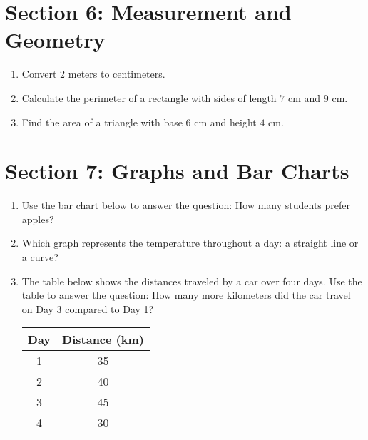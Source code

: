 \documentclass[12pt]{article}
\begin{document}
\section*{Section 6: Measurement and Geometry}
\begin{enumerate}
  \item Convert $2$ meters to centimeters.
  \item Calculate the perimeter of a rectangle with sides of length $7$ cm and $9$ cm.
  \item Find the area of a triangle with base $6$ cm and height $4$ cm.
\end{enumerate}

\section*{Section 7: Graphs and Bar Charts}
\begin{enumerate}
  \item Use the bar chart below to answer the question: How many students prefer apples?
  
  \begin{center}
  \end{center}
  
  \item Which graph represents the temperature throughout a day: a straight line or a curve?
  \item The table below shows the distances traveled by a car over four days. Use the table to answer the question: How many more kilometers did the car travel on Day 3 compared to Day 1?
  
  \begin{center}
  \begin{tabular}{|c|c|}
    \hline
    \textbf{Day} & \textbf{Distance (km)} \\
    \hline
    1 & 35 \\
    2 & 40 \\
    3 & 45 \\
    4 & 30 \\
    \hline
  \end{tabular}
  \end{center}
\end{enumerate}
\end{document}
